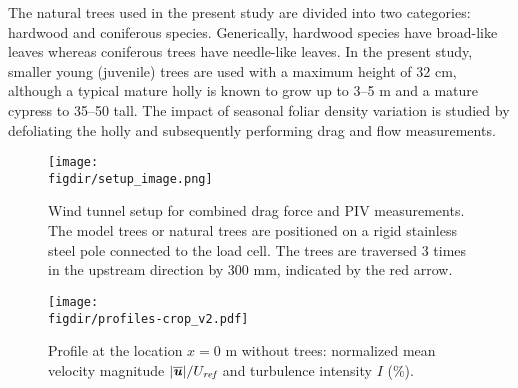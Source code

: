 
The natural trees used in the present study are divided into two categories: hardwood and coniferous species. Generically, hardwood species have broad-like leaves whereas coniferous trees have needle-like leaves. In the present study, smaller young (juvenile) trees are used with a maximum height of $32$ cm, although a typical mature holly is known to grow up to \numrange{3}{5} m and a mature cypress to \numrange{35}{50} tall. The impact of seasonal foliar density variation is studied by defoliating the holly and subsequently performing drag and flow measurements.

	\begin{figure}[p]
	\centering
	\texttt{[image: \\figdir/setup\_image.png]}
	\caption{Wind tunnel setup for combined drag force and PIV measurements. The model trees or natural trees are positioned on a rigid stainless steel pole connected to the load cell. The trees are traversed 3 times in the upstream direction by $300$ mm, indicated by the red arrow.}
	\label{fig:setupimage}
	\end{figure}
	
	\begin{figure}[p]
		\centering
		\texttt{[image: \\figdir/profiles-crop\_v2.pdf]}
		\caption{Profile at the location $x=0$ m without trees:  normalized mean velocity magnitude $|\overline{\textbf{\textit{u}}}|/U_{\textit{ref}}$ and  turbulence intensity $I$ (\%).}
		\label{fig:profiles}
	\end{figure}



